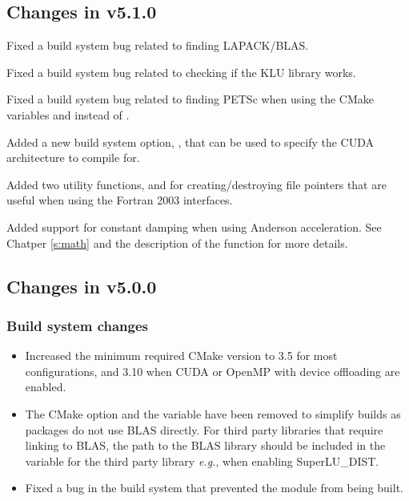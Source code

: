 \subsection*{Changes in v5.1.0}

Fixed a build system bug related to finding LAPACK/BLAS.

Fixed a build system bug related to checking if the KLU library works.

Fixed a build system bug related to finding PETSc when using the CMake
variables  and  instead of
.

Added a new build system option, , that can be used to specify
the CUDA architecture to compile for.

Added two utility functions,  and 
for creating/destroying file pointers that are useful when using the Fortran
2003 interfaces.

Added support for constant damping when using Anderson acceleration. See Chatper
\ref{s:math} and the description of the  function for more
details.

\subsection*{Changes in v5.0.0}

\subsubsection*{Build system changes}

\begin{itemize}
\item Increased the minimum required CMake version to 3.5 for most {\sundials}
configurations, and 3.10 when CUDA or OpenMP with device offloading are enabled.
%
\item The CMake option  and the variable  have
been removed to simplify builds as {\sundials} packages do not use BLAS
directly. For third party libraries that require linking to BLAS, the path to
the BLAS library should be included in the  variable for the
third party library \textit{e.g.},  when enabling
SuperLU\_DIST.
%
\item Fixed a bug in the build system that prevented the {\nvecpthreads} module from
being built.
\end{itemize}

